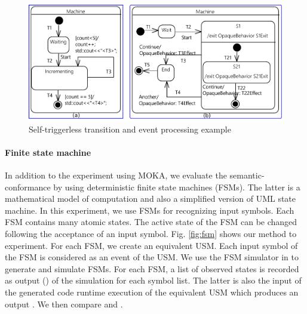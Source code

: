 \begin{figure}
\centering
\includegraphics[clip, trim=0cm 0cm 0cm 0cm, width=\columnwidth]{figures/Deferred004Revised}
\caption{Self-triggerless transition and event processing example} 
\label{fig:autotransition}
\end{figure}

\paragraph{Finite state machine}
In addition to the experiment using MOKA, we evaluate the semantic-conformance by using deterministic finite state machines (FSMs). The latter is a mathematical model of computation and also a simplified version of UML state machine. In this experiment, we use FSMs for recognizing input symbols. Each FSM contains many atomic states. The active state of the FSM can be changed following the acceptance of an input symbol. Fig. \ref{fig:fsm} shows our method to experiment. For each FSM, we create an equivalent USM. Each input symbol of the FSM is considered as an event of the USM. We use the FSM simulator in \cite{fsmsim} to generate and simulate FSMs. For each FSM, a list of observed states is recorded as output () of the simulation for each symbol list. The latter is also the input of the generated code runtime execution of the equivalent USM which produces an output . We then compare  and .


